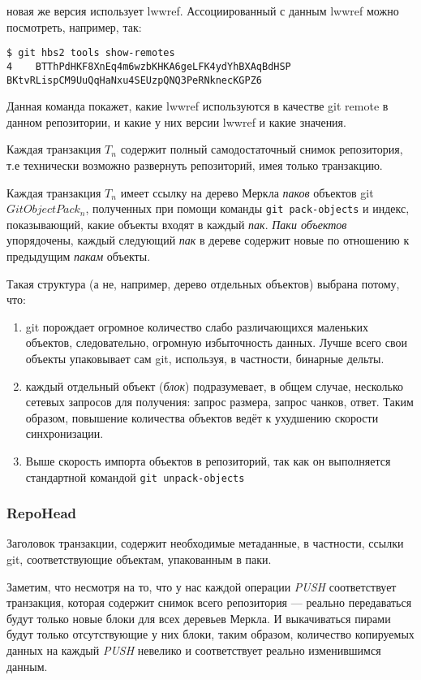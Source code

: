 \documentclass[11pt,a4paper]{article}
\begin{document}
 новая же версия использует lwwref. Ассоциированный с данным lwwref можно посмотреть, например, так:

 \begin{verbatim}
$ git hbs2 tools show-remotes
4    BTThPdHKF8XnEq4m6wzbKHKA6geLFK4ydYhBXAqBdHSP BKtvRLispCM9UuQqHaNxu4SEUzpQNQ3PeRNknecKGPZ6
 \end{verbatim}

Данная команда покажет, какие lwwref используются в качестве git remote в данном репозитории,
и какие у них версии lwwref и какие значения.

Каждая транзакция $T_n$ содержит полный самодостаточный снимок репозитория, т.е технически
возможно развернуть репозиторий, имея только транзакцию.

Каждая транзакция $T_n$ имеет ссылку на дерево Меркла \textit{паков} объектов git
$GitObjectPack_n$, полученных при помощи команды \texttt{git pack-objects} и индекс,
показывающий, какие объекты входят в каждый \textit{пак}. \textit{Паки объектов} упорядочены,
каждый следующий \textit{пак} в дереве содержит новые по отношению к предыдущим \textit{пакам}
объекты.

Такая структура (а не, например, дерево отдельных объектов) выбрана потому, что:

\begin{enumerate}
  \item git порождает огромное количество слабо различающихся маленьких объектов, следовательно,
    огромную избыточность данных. Лучше всего свои объекты упаковывает сам git, используя, в
    частности, бинарные дельты.
  \item каждый отдельный объект (\textit{блок}) подразумевает, в общем случае, несколько
    сетевых запросов для получения: запрос размера, запрос чанков, ответ. Таким образом,
    повышение количества объектов ведёт к ухудшению скорости синхронизации.
  \item Выше скорость импорта объектов в репозиторий, так как он выполняется стандартной
    командой \texttt{git unpack-objects}
\end{enumerate}

\subsubsection*{RepoHead}

Заголовок транзакции, содержит необходимые метаданные, в частности, ссылки git, соответствующие
объектам, упакованным в паки.

Заметим, что несмотря на то, что у нас каждой операции \textit{PUSH} соответствует транзакция,
которая содержит снимок всего репозитория --- реально передаваться будут только новые блоки
для всех деревьев Меркла. И выкачиваться пирами будут только отсутствующие у них блоки, таким
образом, количество копируемых данных на каждый \textit{PUSH} невелико и соответствует реально
изменившимся данным.
\end{document}
